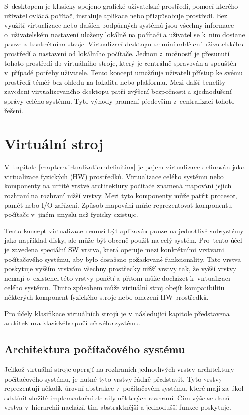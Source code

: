 S~desktopem je klasicky spojeno grafické uživatelské prostředí, pomocí kterého uživatel ovládá počítač, instaluje aplikace
nebo přizpůsobuje prostředí. Bez využití virtualizace nebo dalších podpůrných systémů jsou všechny informace o~uživatelském
nastavení uloženy lokálně na počítači a uživatel se k~nim dostane pouze z~konkrétního stroje. Virtualizací desktopu se míní
oddělení uživatelského prostředí a nastavení od lokálního počítače. Jednou z~možností je přesunutí tohoto prostředí do virtuálního
stroje, který je centrálně spravován a spouštěn v~případě potřeby uživatele. Tento koncept umožňuje uživateli přístup ke svému
prostředí téměř bez ohledu na lokalitu nebo platformu. Mezi další benefity zavedení virtualizovaného desktopu patří zvýšení
bezpečnosti a zjednodušení správy celého systému. Tyto výhody pramení především z~centralizaci tohoto řešení.  
\section{Virtuální stroj}
\label{chapter:virtualization:virtual_machine}
V~kapitole \ref{chapter:virtualization:definition} je pojem virtualizace definován jako virtualizace fyzických (HW) prostředků.
Virtualizace celého systému nebo komponenty na určité vrstvě architektury počítače znamená mapování jejich rozhraní na rozhraní
nižší vrstvy. Mezi tyto komponenty může patřit procesor, paměť nebo I/O zařízení. Způsob mapování může reprezentovat komponentu
počítače v~jiném smyslu než fyzicky existuje.

Tento koncept virtualizace nemusí být aplikován pouze na jednotlivé subsystémy jako například disky, ale může být obecně 
použit na celý systém. Pro~tento účel je zavedena speciální SW vrstva, která operuje mezi konkrétními vrstvami počítačového
systému, aby bylo dosaženo požadované funkcionality. Tato vrstva poskytuje vyšším vrstvám všechny prostředky nižší
vrstvy tak, že vyšší vrstvy nemají o~existenci této vrstvy ponětí a přitom může docházet k~virtualizaci celého systému. Tímto
způsobem může virtuální stroj obejít kompatibilitu některých komponent fyzického stroje nebo omezení HW prostředků.

Pro účely klasifikace virtuálních strojů je v~následující kapitole představena architektura klasického počítačového systému.
\subsection{Architektura počítačového systému}
\label{chapter:virtualization:virtual_machine:computer_architecture}
Jelikož virtuální stroje operují na rozhraních jednotlivých vrstev architektury počítačového systému, je nutné tyto 
vrstvy řádně představit. Tyto vrstvy reprezentují několik úrovní abstrakce v~počítačovém systému, které mají za úkol odstínit
složité implementační detaily některých rozhraní. Čím výše se daná vrstva v~hierarchii nachází, tím abstraktnější a jednodušší
funkce poskytuje.

